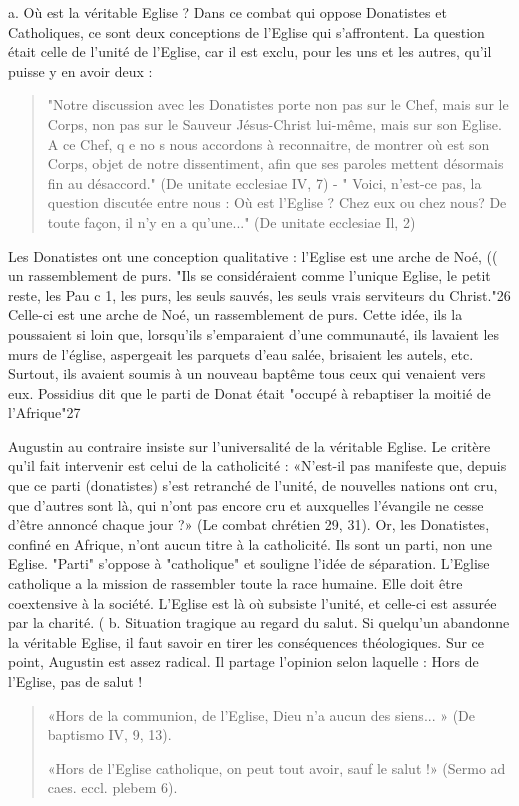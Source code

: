 a.	Où est la	véritable Eglise	? Dans ce combat qui oppose Donatistes et Catholiques, ce sont deux conceptions de l'Eglise qui s'affrontent. La question était celle
de l'unité de l'Eglise, car il est exclu, pour les uns et les autres, qu'il puisse y en avoir deux :
\begin{quote}
    "Notre discussion avec les Donatistes porte non pas sur le Chef, mais sur le Corps, non pas sur le Sauveur Jésus-Christ lui-même, mais sur son Eglise. A ce Chef, q e no s nous accordons à reconnaitre, de montrer où est son Corps, objet de notre dissentiment, afin que ses paroles mettent désormais fin au désaccord." (De
unitate ecclesiae IV, 7) -
" Voici, n'est-ce pas, la question discutée entre nous : Où est l'Eglise ? Chez eux ou chez nous? De toute façon, il n'y en a qu'une..." (De unitate ecclesiae Il, 2)
\end{quote}
 
 
 	Les Donatistes ont une conception qualitative : l'Eglise est une arche de Noé,	(( un rassemblement de purs.  "Ils se considéraient comme l'unique Eglise, le petit reste,
les Pau c 1, les purs, les seuls sauvés, les seuls vrais serviteurs du Christ."26 Celle-ci est une arche de Noé, un rassemblement de purs. Cette idée, ils la poussaient si loin que, lorsqu'ils s'emparaient d'une communauté, ils lavaient les murs de l'église, aspergeait les parquets d'eau salée, brisaient les autels, etc. Surtout, ils avaient soumis à un nouveau baptême tous ceux qui venaient vers eux. Possidius dit que le parti de Donat était "occupé à rebaptiser la moitié de l'Afrique"27

 	Augustin au contraire insiste sur l'universalité de la véritable Eglise. Le critère qu'il fait intervenir est celui de la catholicité : «N'est-il pas manifeste que, depuis que ce parti (donatistes) s'est retranché de l'unité, de nouvelles nations ont cru, que d'autres sont là, qui n'ont pas encore cru et auxquelles l'évangile ne cesse d'être annoncé chaque jour ?» (Le combat chrétien 29, 31). Or, les Donatistes, confiné en Afrique, n'ont aucun titre à la catholicité. Ils sont un parti, non une Eglise. "Parti" s'oppose à "catholique" et souligne l'idée de séparation. L'Eglise catholique a la
mission de rassembler toute la race humaine. Elle doit  être coextensive à la société.
L'Eglise est là où subsiste l'unité, et celle-ci est assurée par la charité.	(
b.	Situation  tragique au regard du salut.  Si quelqu'un abandonne la véritable Eglise, il faut savoir en tirer les conséquences théologiques. Sur ce point, Augustin est assez radical. Il partage l'opinion selon laquelle : Hors de l'Eglise, pas de salut !
\begin{quote}
    «Hors de la communion, de l'Eglise, Dieu n'a aucun des siens... » (De baptismo IV, 9, 13). 
    
    «Hors de l'Eglise catholique, on peut tout avoir, sauf le salut !» (Sermo ad caes. eccl. plebem 6).
\end{quote} 

